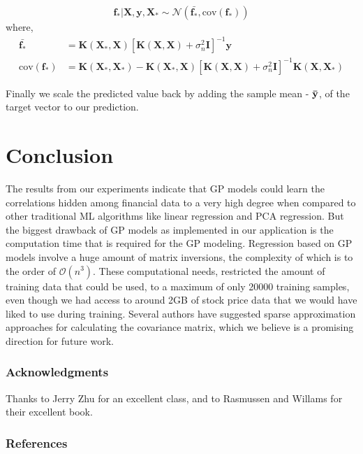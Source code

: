 \documentclass{article} %
\begin{document}
\begin{equation}
 \boldsymbol{f_*} | \boldsymbol{X}, \boldsymbol{y}, \boldsymbol{X_*} \sim \mathcal{N}\left(\bar{\boldsymbol{f_*}}, \mbox{cov}(\boldsymbol{f_*})\right)
\end{equation}
where,
\begin{align}
\bar{\boldsymbol{f_*}} &= \boldsymbol{K}\left(\boldsymbol{X_*}, \boldsymbol{X}\right) \left[ \boldsymbol{K}\left(\boldsymbol{X}, \boldsymbol{X}\right) + \sigma_n^2\boldsymbol{I}\right]^{-1} \boldsymbol{y} \\
\mbox{cov}(\boldsymbol{f_*}) &= \boldsymbol{K}\left(\boldsymbol{X_*}, \boldsymbol{X_*}\right) - \boldsymbol{K}\left(\boldsymbol{X_*}, \boldsymbol{X}\right) \left[ \boldsymbol{K}\left(\boldsymbol{X}, \boldsymbol{X}\right) + \sigma_n^2\boldsymbol{I}\right]^{-1} \boldsymbol{K}\left(\boldsymbol{X}, \boldsymbol{X_*}\right)
\end{align}


Finally we scale the predicted value back by adding the sample mean - $\bf\bar{y}$, of the target vector to our prediction.

\section{Conclusion}

The results from our experiments indicate that GP models could learn the correlations hidden among financial data to a very high degree when compared to other traditional ML algorithms like linear regression and PCA regression. But the biggest drawback of GP models as implemented in our application is the computation time that is required for the GP modeling. Regression based on GP models involve a huge amount of matrix inversions, the complexity of which is to the order of $\mathcal{O}(n^3)$. These computational needs, restricted the amount of training data that could be used, to a maximum of only 20000 training samples, even though we had access to around 2GB of stock price data that we would have liked to use during training. Several authors have suggested sparse approximation approaches for calculating the covariance matrix, which we believe is a promising direction for future work. 

\subsubsection*{Acknowledgments}
Thanks to Jerry Zhu for an excellent class, and to Rasmussen and Willams for their excellent book.

\subsubsection*{References}
\small{
}
\end{document}
